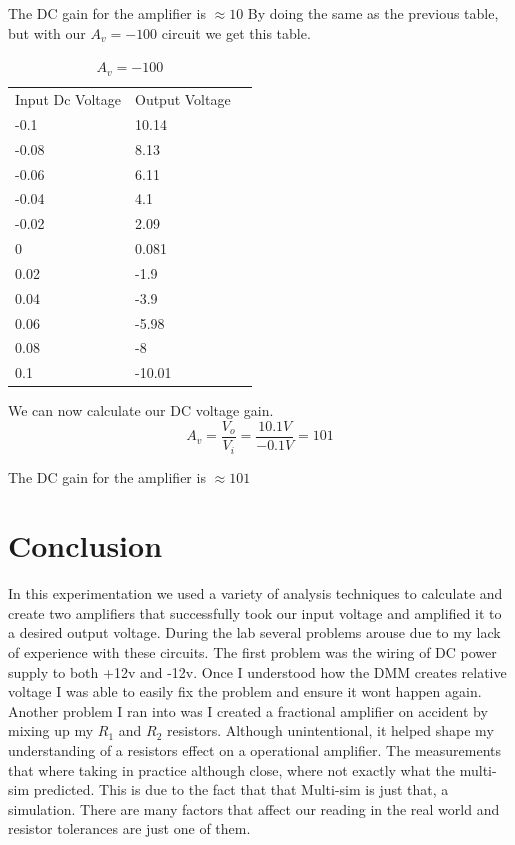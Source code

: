 \documentclass[12pt]{article}
\begin{document}
The DC gain for the amplifier is $\approx 10$
\newpage
By doing the same as the previous table, but with our $A_v=-100$ circuit we get this table.

\begin{table}[!h]
	\centering
	\caption{$A_v=-100$}
	\label{table 2}
	\begin{tabular}{lll}
		Input Dc Voltage & Output Voltage &  \\
		-0.1             & 10.14          &  \\
		-0.08            & 8.13           &  \\
		-0.06            & 6.11           &  \\
		-0.04            & 4.1            &  \\
		-0.02            & 2.09           &  \\
		0                & 0.081          &  \\
		0.02             & -1.9           &  \\
		0.04             & -3.9           &  \\
		0.06             & -5.98          &  \\
		0.08             & -8             &  \\
		0.1              & -10.01         & 
	\end{tabular}
\end{table}

We can now calculate our DC voltage gain.
$$A_v = \frac{V_o}{V_i} = \frac{10.1V}{-0.1V} = 101$$

The DC gain for the amplifier is $\approx 101$



\section{Conclusion}

In this experimentation we used a variety of analysis techniques to calculate and create two amplifiers that successfully took our input voltage and amplified it to a desired output voltage. During the lab several problems arouse due to my lack of experience with these circuits. The first problem was the wiring of DC power supply to both +12v and -12v. Once I understood how the DMM creates relative voltage I was able to easily fix the problem and ensure it wont happen again. Another problem I ran into was I created a fractional amplifier on accident by mixing up my $R_1$ and $R_2$ resistors. Although unintentional, it helped shape my understanding of a resistors effect on a operational amplifier. The measurements that where taking in practice although close, where not exactly what the multi-sim predicted. This is due to the fact that that Multi-sim is just that, a simulation. There are many factors that affect our reading in the real world and resistor tolerances are just one of them.
\end{document}
